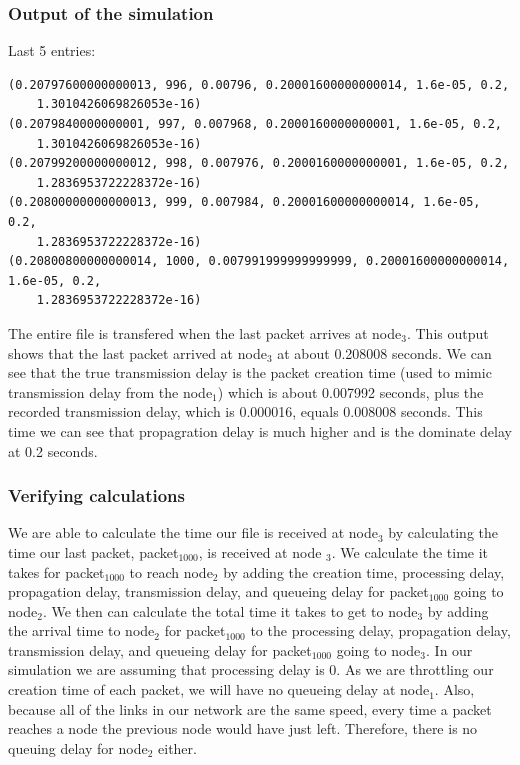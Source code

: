 \documentclass[fleqn,11pt]{article}
\begin{document}
\subsubsection{Output of the simulation}
Last 5 entries:
\begin{lstlisting}
(0.20797600000000013, 996, 0.00796, 0.20001600000000014, 1.6e-05, 0.2, 
	1.3010426069826053e-16)
(0.2079840000000001, 997, 0.007968, 0.2000160000000001, 1.6e-05, 0.2,
	1.3010426069826053e-16)
(0.20799200000000012, 998, 0.007976, 0.2000160000000001, 1.6e-05, 0.2, 
	1.2836953722228372e-16)
(0.20800000000000013, 999, 0.007984, 0.20001600000000014, 1.6e-05, 0.2, 
	1.2836953722228372e-16)
(0.20800800000000014, 1000, 0.007991999999999999, 0.20001600000000014, 1.6e-05, 0.2, 
	1.2836953722228372e-16)
\end{lstlisting}
The entire file is transfered when the last packet arrives at node$_3$. This output shows that the last packet arrived at node$_3$ at about 0.208008 seconds. We can see that the true transmission delay is the packet creation time (used to mimic transmission delay from the node$_1$) which is about 0.007992 seconds, plus the recorded transmission delay, which is 0.000016, equals 0.008008 seconds. This time we can see that propagration delay is much higher and is the dominate delay at 0.2 seconds.
\subsubsection{Verifying calculations}
We are able to calculate the time our file is received at node$_3$ by calculating the time our last packet, packet$_{1000}$, is received at node $_3$. We calculate the time it takes for packet$_{1000}$ to reach node$_2$ by adding the creation time, processing delay, propagation delay, transmission delay, and queueing delay for packet$_{1000}$ going to node$_2$. We then can calculate the total time it takes to get to node$_3$ by adding the arrival time to node$_2$ for packet$_{1000}$ to the processing delay, propagation delay, transmission delay, and queueing delay for packet$_{1000}$ going to node$_3$. In our simulation we are assuming that processing delay is 0. As we are throttling our creation time of each packet, we will have no queueing delay at node$_1$. Also, because all of the links in our network are the same speed, every time a packet reaches a node the previous node would have just left. Therefore, there is no queuing delay for node$_2$ either.
\end{document}
